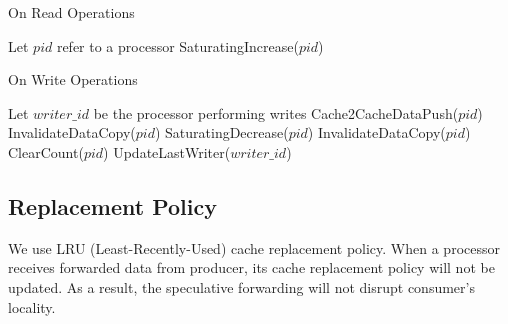 \documentclass[11pt,conference]{IEEEtran}
\begin{document}
\begin{algorithm}
\caption{On Read Operations}
\label{read_operations}
\begin{algorithmic}[1]
\State Let $pid$ refer to a processor
    \State SaturatingIncrease($pid$) 
\EndFor
\end{algorithmic}
\end{algorithm}
\FloatBarrier

\begin{algorithm}
\caption{On Write Operations}
\label{write_operations}
\begin{algorithmic}[1]
\State Let $writer\_id$ be the processor performing writes
     
            \State Cache2CacheDataPush($pid$) 
        \Else
            \State InvalidateDataCopy($pid$) 
        \EndIf
    \EndFor
\Else
     
        \State SaturatingDecrease($pid$) 
        \State InvalidateDataCopy($pid$) 
        \State ClearCount($pid$) 
    \EndFor
    \State UpdateLastWriter($writer\_id$)
\EndIf
\end{algorithmic}
\end{algorithm}
\FloatBarrier




\subsection{Replacement Policy}
We use LRU (Least-Recently-Used) cache replacement policy. When a processor receives forwarded data from producer, its cache replacement policy will not be updated. As a result, the speculative forwarding will not disrupt consumer's locality.
\end{document}
